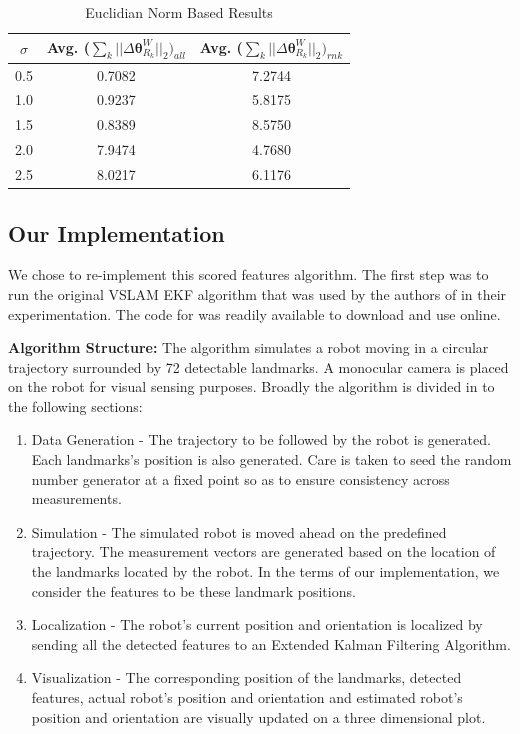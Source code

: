 \documentclass[10pt,twocolumn,letterpaper]{article}
\begin{document}
\begin{table}[t]
\begin{center}
\begin{tabular}{|c|c|c|}
\hline
$\sigma$ & Avg. ($\sum_k || \Delta \boldsymbol{\theta}_{R_k}^W ||_2)_{all}$ & Avg. ($ \sum_k || \Delta \boldsymbol{\theta}_{R_k}^W ||_2)_{rnk}$\\
\hline
0.5  & 0.7082  &  7.2744\\
\hline
1.0  &  0.9237 &  5.8175\\
\hline
1.5  &  0.8389 &  8.5750\\
\hline
2.0  &  7.9474 &  4.7680\\
\hline
2.5  &  8.0217 &  6.1176\\
\hline
\end{tabular}
\end{center}
\caption{Euclidian Norm Based Results}
\end{table}

\subsection{Our Implementation}
We chose to re-implement this scored features algorithm. The first step was to run the original VSLAM EKF algorithm \cite{31} that was used by the authors of \cite{Zhang_2015_CVPR} in their experimentation. The code for \cite{31} was readily available to download and use online.

\textbf{Algorithm Structure:} The algorithm simulates a robot moving in a circular trajectory surrounded by 72 detectable landmarks. A monocular camera is placed on the robot for visual sensing purposes. Broadly the algorithm is divided in to the following sections:
\begin{enumerate}
  \item Data Generation - The trajectory to be followed by the robot is generated. Each landmarks's position is also generated. Care is taken to seed the random number generator at a fixed point so as to ensure consistency across measurements.
  \item Simulation - The simulated robot is moved ahead on the predefined trajectory. The measurement vectors are generated based on the location of the landmarks located by the robot. In the terms of our implementation, we consider the features to be these landmark positions. 
 \item Localization - The robot's current position and orientation is localized by sending all the detected features to an Extended Kalman Filtering Algorithm.
\item Visualization - The corresponding position of the landmarks, detected features, actual robot's position and orientation and estimated robot's position and orientation are visually updated on a three dimensional plot.
\end{enumerate}
\end{document}
